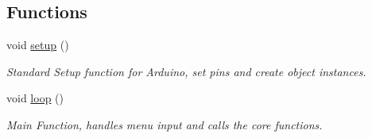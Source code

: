 \subsection*{\-Functions}
\begin{DoxyCompactItemize}
\item 
void \hyperlink{sailcode__alpha6_8pde_a4fc01d736fe50cf5b977f755b675f11d}{setup} ()
\begin{DoxyCompactList}\small\item\em \-Standard \-Setup function for \-Arduino, set pins and create object instances. \end{DoxyCompactList}\item 
void \hyperlink{sailcode__alpha6_8pde_afe461d27b9c48d5921c00d521181f12f}{loop} ()
\begin{DoxyCompactList}\small\item\em \-Main \-Function, handles menu input and calls the core functions. \end{DoxyCompactList}\end{DoxyCompactItemize}
